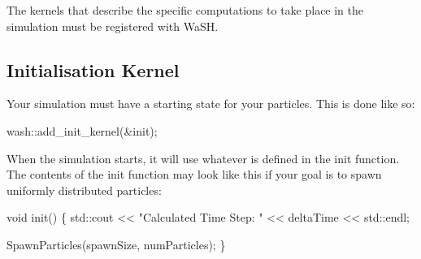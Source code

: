 The kernels that describe the specific computations to take place in the simulation must be registered with Wa\+SH.

\subsection*{Initialisation Kernel}

Your simulation must have a starting state for your particles. This is done like so\+: 
\begin{DoxyCode}
wash::add\_init\_kernel(&init);
\end{DoxyCode}
 When the simulation starts, it will use whatever is defined in the {\ttfamily init} function. The contents of the {\ttfamily init} function may look like this if your goal is to spawn uniformly distributed particles\+: 
\begin{DoxyCode}
\textcolor{keywordtype}{void} init() \{
    std::cout << \textcolor{stringliteral}{"Calculated Time Step: "} << deltaTime << std::endl;

    SpawnParticles(spawnSize, numParticles);
\}
\end{DoxyCode}



